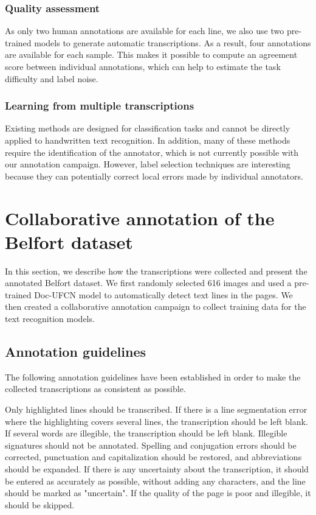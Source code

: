 \documentclass[sigconf]{acmart}
\begin{document}
\subsubsection{Quality assessment}
As only two human annotations are available for each line, we also use two pre-trained models to generate automatic transcriptions. As a result, four annotations are available for each sample. This makes it possible to compute an agreement score between individual annotations, which can help to estimate the task difficulty and label noise.


\subsubsection{Learning from multiple transcriptions}
Existing methods are designed for classification tasks and cannot be directly applied to handwritten text recognition. In addition, many of these methods require the identification of the annotator, which is not currently possible with our annotation campaign.
However, label selection techniques are interesting because they can potentially correct local errors made by individual annotators. 

\section{Collaborative annotation of the Belfort dataset}
\label{sec:dataset}

In this section, we describe how the transcriptions were collected and present the annotated Belfort dataset. We first randomly selected 616 images and used a pre-trained Doc-UFCN \cite{boillet2020} model to automatically detect text lines in the pages. We then created a collaborative annotation campaign to collect training data for the text recognition models.

\subsection{Annotation guidelines}

The following annotation guidelines have been established in order to make the collected transcriptions as consistent as possible. 

Only highlighted lines should be transcribed. If there is a line segmentation error where the highlighting covers several lines, the transcription should be left blank. If several words are illegible, the transcription should be left blank. Illegible signatures should not be annotated. 
Spelling and conjugation errors should be corrected, punctuation and capitalization should be restored, and abbreviations should be expanded. 
If there is any uncertainty about the transcription, it should be entered as accurately as possible, without adding any characters, and the line should be marked as "uncertain". If the quality of the page is poor and illegible, it should be skipped.
\end{document}

